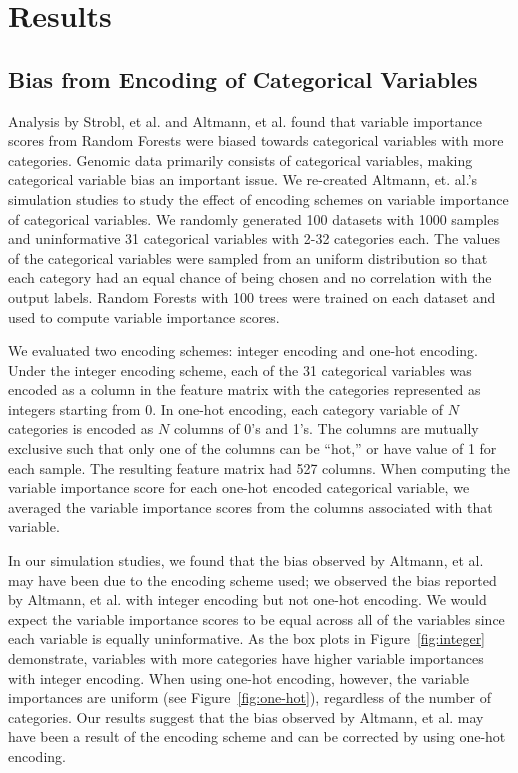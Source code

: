 \section{Results}

\subsection{Bias from Encoding of Categorical Variables}
Analysis by Strobl, et al. \cite{Strobl2007} and Altmann, et al. \cite{Altmann2010} found that variable importance scores from Random Forests were biased towards categorical variables with more categories.  Genomic data primarily consists of categorical variables, making categorical variable bias an important issue.  We re-created Altmann, et. al.'s simulation studies to study the effect of encoding schemes on variable importance of categorical variables.  We randomly generated 100 datasets with 1000 samples and uninformative 31 categorical variables with 2-32 categories each.  The values of the categorical variables were sampled from an uniform distribution so that each category had an equal chance of being chosen and no correlation with the output labels. Random Forests with 100 trees were trained on each dataset and used to compute variable importance scores.

We evaluated two encoding schemes: integer encoding and one-hot encoding.  Under the integer encoding scheme, each of the 31 categorical variables was encoded as a column in the feature matrix with the categories represented as integers starting from 0.  In one-hot encoding, each category variable of $N$ categories is encoded as $N$ columns of 0's and 1's.  The columns are mutually exclusive such that only one of the columns can be ``hot,'' or have value of 1 for each sample.  The resulting feature matrix had 527 columns.  When computing the variable importance score for each one-hot encoded categorical variable, we averaged the variable importance scores from the columns associated with that variable.

In our simulation studies, we found that the bias observed by Altmann, et al. \cite{Altmann2010} may have been due to the encoding scheme used; we observed the bias reported by Altmann, et al. with integer encoding but not one-hot encoding. We would expect the variable importance scores to be equal across all of the variables since each variable is equally uninformative.  As the box plots in Figure~\ref{fig:integer} demonstrate, variables with more categories have higher variable importances with integer encoding.   When using one-hot encoding, however, the variable importances are uniform (see Figure~\ref{fig:one-hot}), regardless of the number of categories.  Our results suggest that the bias observed by Altmann, et al. may have been a result of the encoding scheme and can be corrected by using one-hot encoding.

